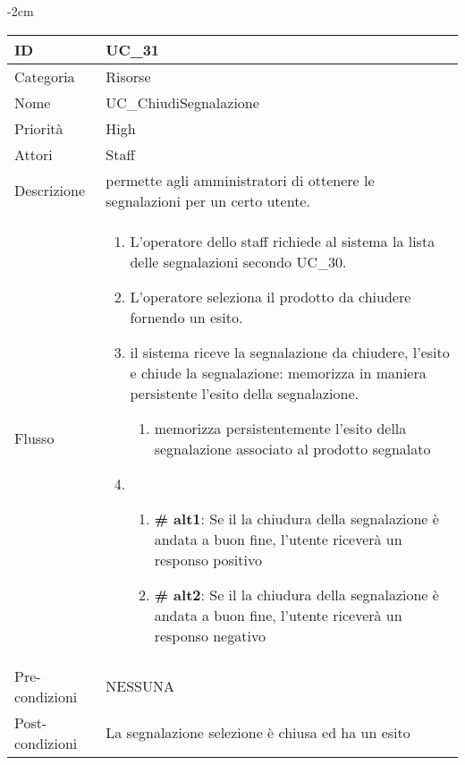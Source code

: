 \begin{center}
\begin{table}[bp]
    \centering
    \addtolength{\leftskip} {-2cm}
\begin{tabular}{ |p{2.6cm}|p{13cm}|  }
\hline
ID & UC\_31 \\\hline
Categoria & Risorse\\\hline
Nome & UC\_ChiudiSegnalazione\\\hline
Priorità & High \\\hline
Attori &  Staff \\\hline
Descrizione & permette agli amministratori di ottenere le segnalazioni per un certo utente.\\\hline
Flusso &  	\vspace{-5mm} \begin{enumerate}
			\item L'operatore dello staff richiede al sistema la lista delle segnalazioni secondo UC\_30.
			\item L'operatore seleziona il prodotto da chiudere fornendo un esito.
			\item il sistema riceve la segnalazione da chiudere, l'esito e chiude la segnalazione: 
			memorizza in maniera persistente l'esito della segnalazione. 
			\begin{enumerate}
			\item memorizza persistentemente l'esito della segnalazione associato al prodotto segnalato
			\end{enumerate}
			\item \begin{enumerate}[label= ]
				\item \textbf{\# alt1}: Se il la chiudura della segnalazione è andata a buon fine, l'utente riceverà un responso positivo
				\item \textbf{\# alt2}: Se il la chiudura della segnalazione è andata a buon fine, l'utente riceverà un responso negativo
			\end{enumerate}
			\end{enumerate}
			\\\hline
Pre-condizioni & NESSUNA\\\hline
Post-condizioni & La segnalazione selezione è chiusa ed ha un esito\\\hline
\end{tabular}
\label{table_use_case:31}\newline
\end{table}


\end{center}
